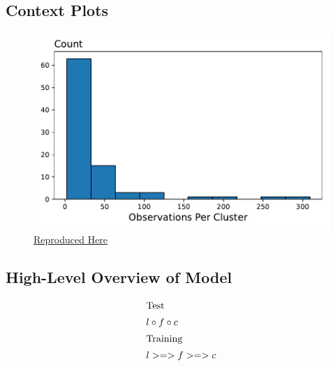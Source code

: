 \documentclass[a4paper,12pt]{article}
\begin{document}
\subsection{Context Plots}
\begin{figure}[htbp]
\centering
\includegraphics[width=.5\linewidth]{figures/rtc/results/cceh/cluster_dist_False_False.pdf}
\caption{ \href{https://github.com/pharringtonp19/evictions/blob/main/scripts/cceh/primary/diff_n_mean_rrh.py}{Reproduced Here}}
\label{FIGURE LABEL}
\end{figure}
\subsection{High-Level Overview of Model}
\begin{align*}
\intertext{Test}
    &l \circ f \circ c \\ 
\intertext{Training} 
    &l >=> f >=> c \\ 
\end{align*}
\end{document}
